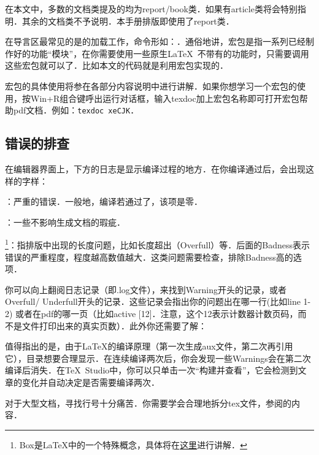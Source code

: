 在本文中，多数的文档类提及的均为report/book类．如果有article类将会特别指明．其余的文档类不予说明．本手册排版即使用了report类．\dpar

在导言区最常见的是的加载工作，命令形如：．通俗地讲，宏包是指一系列已经制作好的功能``模块''，在你需要使用一些原生\LaTeX\ 不带有的功能时，只需要调用这些宏包就可以了．比如本文的代码就是利用宏包实现的．

宏包的具体使用将参在各部分内容说明中进行讲解．如果你想学习一个宏包的使用，按Win+R组合键呼出运行对话框，输入texdoc加上宏包名称即可打开宏包帮助pdf文档．例如：\verb|texdoc xeCJK|．


\subsection{错误的排查}
\label{subsec:debug}
在编辑器界面上，下方的日志是显示编译过程的地方．在你编译通过后，会出现这样的字样：
\begin{feai}
	\item {}：严重的错误．一般地，编译若通过了，该项是零．
	\item {}：一些不影响生成文档的瑕疵．
	\item {\footnote{Box是\LaTeX{}中的一个特殊概念，具体将在\hyperref[sec:box]{这里}进行讲解．}}：指排版中出现的长度问题，比如长度超出（Overfull）等．后面的Badness表示错误的严重程度，程度越高数值越大．这类问题需要检查，排除Badness高的选项．
\end{feai}

你可以向上翻阅日志记录（即.log文件），来找到Warning开头的记录，或者Overfull/ Underfull开头的记录．这些记录会指出你的问题出在哪一行(比如line 1-2) 或者在pdf的哪一页（比如active [12]．注意，这个12表示计数器计数页码，而不是文件打印出来的真实页数）．此外你还需要了解：
\begin{feai}
	\item 值得指出的是，由于\LaTeX{}的编译原理（第一次生成aux文件，第二次再引用它），目录想要合理显示．在连续编译两次后，你会发现一些Warnings会在第二次编译后消失．在\TeX\ Studio中，你可以只单击一次“构建并查看”，它会检测到文章的变化并自动决定是否需要编译两次．
	\item 对于大型文档，寻找行号十分痛苦．你需要学会合理地拆分tex文件，参阅的内容．
\end{feai}


